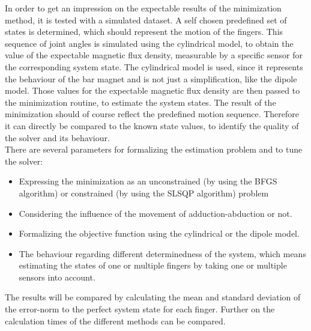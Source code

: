 In order to get an impression on the expectable results of the minimization method, it is tested with a simulated dataset. A self chosen predefined set of states is determined, which should represent the motion of the fingers. This sequence of joint angles is simulated using the cylindrical model, to obtain the value of the expectable magnetic flux density, measurable by a specific sensor for the corresponding system state. The cylindrical model is used, since it represents the behaviour of the bar magnet and is not just a simplification, like the dipole model. Those values for the expectable magnetic flux density are then passed to the minimization routine, to estimate the system states. The result of the minimization should of course reflect the predefined motion sequence. Therefore it can directly be compared to the known state values, to identify the quality of the solver and its behaviour.\\
There are several parameters for formalizing the estimation problem and to tune the solver:
\begin{itemize}
\item Expressing the minimization as an unconstrained (by using the \ac{BFGS} algorithm) or constrained (by using the \ac{SLSQP} algorithm) problem
\item Considering the influence of the movement of adduction-abduction or not.
\item Formalizing the objective function using the cylindrical or the dipole model.
\item The behaviour regarding different determinedness of the system, which means estimating the states of one or multiple fingers by taking one or multiple sensors into account.
\end{itemize}
The results will be compared by calculating the mean and standard deviation of the error-norm to the perfect system state for each finger. Further on the calculation times of the different methods can be compared.


